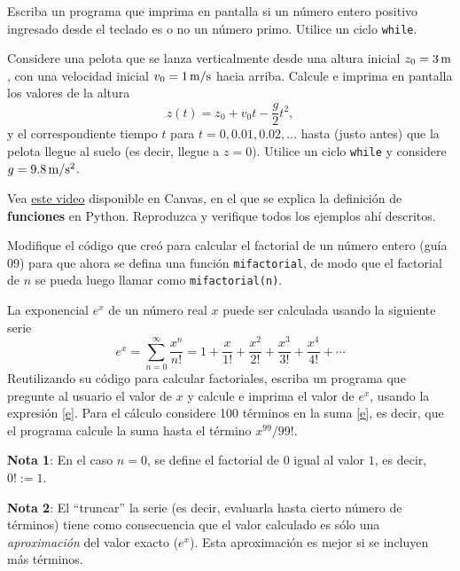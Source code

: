 \documentclass[11pt]{exam}
\begin{document}
\begin{questions}
\item Escriba un programa que imprima en pantalla si un número entero positivo ingresado desde el teclado es o no un número primo. Utilice un ciclo \texttt{while}.

\item Considere una pelota que se lanza verticalmente desde una altura inicial $z_0=3\,\rm m$, con una velocidad inicial $v_0 = 1 \,\rm m/s$ hacia arriba. Calcule e imprima en pantalla los valores de la altura
\begin{equation}
 z(t) = z_0 + v_0 t -\frac{g}{2}t^2,
\end{equation} 
y el correspondiente tiempo $t$ para $t=0,0.01,0.02,\dots$ hasta (justo antes) que la pelota llegue al suelo (es decir, llegue a $z=0$). Utilice un ciclo \texttt{while} y considere $g=9.8\,\rm m/s^2$.

\item Vea \href{https://udec.instructure.com/courses/40179/pages/funciones?module_item_id=1465539}{este video} disponible en Canvas, en el que se explica la definición de \textbf{funciones} en Python. Reproduzca y verifique todos los ejemplos ahí descritos.

\item Modifique el código que creó para calcular el factorial de un número entero (guía 09) para que ahora se defina una función \texttt{mifactorial}, de modo que el factorial de $n$ se pueda luego llamar como \texttt{mifactorial(n)}.

\item La exponencial $e^x$ de un número real $x$ puede ser calculada usando la siguiente serie
\begin{equation}\label{e}
e^x = \sum_{n=0}^\infty \frac{x^n}{n!}=1 + \frac{x}{1!} + \frac{x^2}{2!} + \frac{x^3}{3!} + \frac{x^4}{4!} + \cdots
\end{equation}
Reutilizando su código para calcular factoriales, escriba un programa que pregunte al usuario el valor de $x$ y calcule e imprima el valor de $e^x$, usando la expresión \eqref{e}. Para el cálculo considere 100 términos en la suma \eqref{e}, es decir, que el programa calcule la suma hasta el término $x^{99}/{99!}$. 

\textbf{Nota 1}: En el caso $n=0$, se define el factorial de $0$ igual al valor $1$, es decir, $0! :=1$.

\textbf{Nota 2}: El ``truncar'' la serie (es decir, evaluarla hasta cierto número de términos) tiene como consecuencia que el valor calculado es sólo una \textit{aproximación} del valor exacto ($e^x$). Esta aproximación es mejor si se incluyen más términos.


\end{questions}
\end{document}
